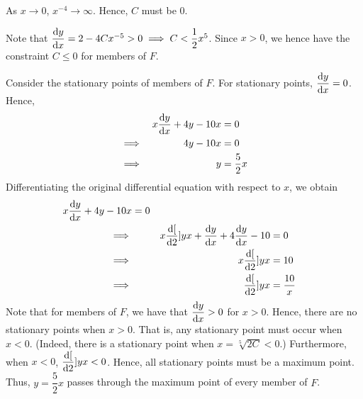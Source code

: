 \documentclass{echw}
\begin{document}

        As $x \to 0$, $x^{-4} \to \infty$. Hence, $C$ must be 0.

        Note that $\dfrac{\mathrm{d} y}{\mathrm{d} x} = 2 - 4Cx^{-5} > 0 \implies C < \dfrac12 x^5$. Since $x > 0$, we hence have the constraint $C \leq 0$ for members of $F$.

        \begin{center}
        \end{center}

        Consider the stationary points of members of $F$. For stationary points, $\dfrac{\mathrm{d} y}{\mathrm{d} x} = 0$. Hence,
        \begin{alignat*}{2}
            && x\dfrac{\mathrm{d} y}{\mathrm{d} x} + 4y - 10x &= 0\\
            \implies&& 4y - 10 x &= 0\\
            \implies&& y &= \dfrac52 x
        \end{alignat*}
        Differentiating the original differential equation with respect to $x$, we obtain
        \begin{alignat*}{2}
            x\dfrac{\mathrm{d} y}{\mathrm{d} x} + 4y - 10x &= 0\\
            \implies&& x \dfrac{\mathrm{d} [}{\mathrm{d} 2}]{y}{x} + \dfrac{\mathrm{d} y}{\mathrm{d} x} + 4\dfrac{\mathrm{d} y}{\mathrm{d} x} - 10 &= 0\\
            \implies&& x \dfrac{\mathrm{d} [}{\mathrm{d} 2}]{y}{x} &= 10\\
            \implies&& \dfrac{\mathrm{d} [}{\mathrm{d} 2}]{y}{x} &= \dfrac{10}{x}
        \end{alignat*}
        Note that for members of $F$, we have that $\dfrac{\mathrm{d} y}{\mathrm{d} x} > 0$ for $x > 0$. Hence, there are no stationary points when $x > 0$. That is, any stationary point must occur when $x < 0$. (Indeed, there is a stationary point when $x = \sqrt[5]{2C} < 0$.) Furthermore, when $x < 0$, $\dfrac{\mathrm{d} [}{\mathrm{d} 2}]{y}{x} < 0$. Hence, all stationary points must be a maximum point. Thus, $\boxed{y = \dfrac52 x}$ passes through the maximum point of every member of $F$.
\end{document}
